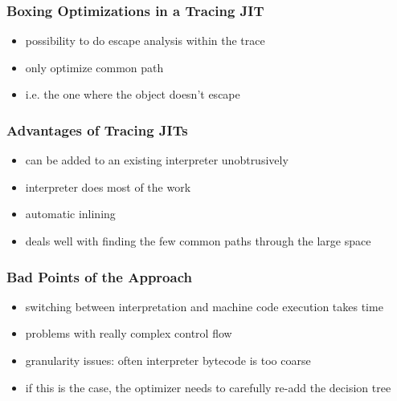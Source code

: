 \documentclass[utf8x]{beamer}
\begin{document}
\begin{frame}
  \frametitle{Boxing Optimizations in a Tracing JIT}
  \begin{itemize}
      \item possibility to do escape analysis within the trace
      \item only optimize common path
      \item i.e. the one where the object doesn't escape
  \end{itemize}
\end{frame}


\begin{frame}
    \frametitle{Advantages of Tracing JITs}
    \begin{itemize}
    \item can be added to an existing interpreter unobtrusively
    \item interpreter does most of the work
    \item automatic inlining
    \item deals well with finding the few common paths through the large space
    \end{itemize}
\end{frame}

\begin{frame}
    \frametitle{Bad Points of the Approach}
    \begin{itemize}
        \item switching between interpretation and machine code execution takes time
        \item problems with really complex control flow
        \item granularity issues: often interpreter bytecode is too coarse
        \item if this is the case, the optimizer needs to carefully re-add the decision tree
    \end{itemize}
\end{frame}
\end{document}
